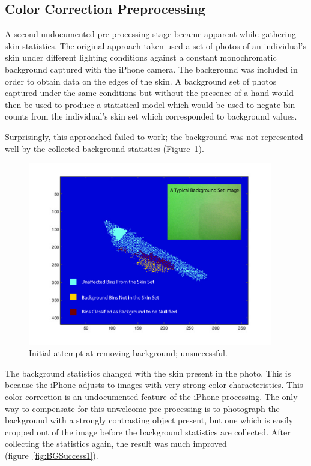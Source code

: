 \subsection{Color Correction Preprocessing}
A second undocumented pre-processing stage became apparent while gathering skin statistics. The original approach taken used a set of photos of an individual's skin  under different lighting conditions against a constant monochromatic background captured with the iPhone camera. The background was included in order to obtain data on the edges of the skin. A background set of photos captured under the same conditions but without the presence of a hand would then be used to produce a statistical model which would be used to negate bin counts from the individual's skin set which corresponded to background values.

Surprisingly, this approached failed to work; the background was not represented well by the collected background statistics (Figure~\ref{fig:BGFailure}).

\begin{figure}[h!]
  \centering
    \includegraphics[width=0.95\textwidth]{Chapter3/Figs/CaCb_bg_failed.jpg}
    \caption{Initial attempt at removing background; unsuccessful.} \label{fig:BGFailure}
\end{figure}

The background statistics changed with the skin present in the photo. This is because the iPhone adjusts to images with very strong color characteristics. This color correction is an undocumented feature of the iPhone processing. The only way to compensate for this unwelcome pre-processing is to photograph the background with a strongly contrasting object present, but one which is easily cropped out of the image before the background statistics are collected. After collecting the statistics again, the result was much improved (figure~\ref{fig:BGSuccess1}).

